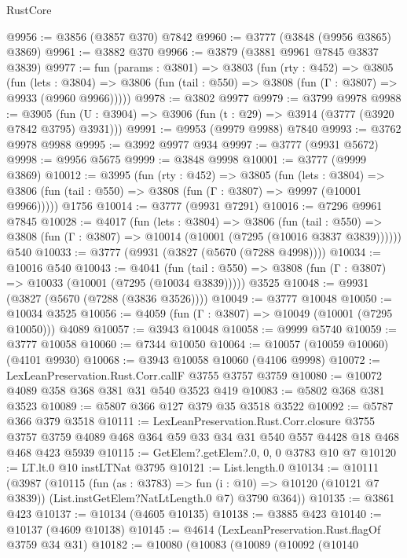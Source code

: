 \begin{lexlean}{RustCore}
\begin{coremodule}
@9956 := @3856 (@3857 @370) @7842
@9960 := @3777 (@3848 (@9956 @3865) @3869)
@9961 := @3882 @370
@9966 := @3879 (@3881 @9961 @7845 @3837 @3839)
@9977 := fun (params : @3801) =>
  @3803
    (fun (rty : @452) =>
    @3805
      (fun (lets : @3804) =>
      @3806 (fun (tail : @550) => @3808 (fun (Γ : @3807) => @9933 (@9960 @9966)))))
@9978 := @3802 @9977
@9979 := @3799 @9978
@9988 := @3905 (fun (U : @3904) => @3906 (fun (t : @29) => @3914 (@3777 (@3920 @7842 @3795) @3931)))
@9991 := @9953 (@9979 @9988) @7840
@9993 := @3762 @9978 @9988
@9995 := @3992 @9977 @934
@9997 := @3777 (@9931 @5672)
@9998 := @9956 @5675
@9999 := @3848 @9998
@10001 := @3777 (@9999 @3869)
@10012 := @3995
    (fun (rty : @452) =>
    @3805
      (fun (lets : @3804) =>
      @3806 (fun (tail : @550) => @3808 (fun (Γ : @3807) => @9997 (@10001 @9966)))))
    @1756
@10014 := @3777 (@9931 @7291)
@10016 := @7296 @9961 @7845
@10028 := @4017
    (fun (lets : @3804) =>
    @3806
      (fun (tail : @550) =>
      @3808 (fun (Γ : @3807) => @10014 (@10001 (@7295 (@10016 @3837 @3839))))))
    @540
@10033 := @3777 (@9931 (@3827 (@5670 (@7288 @4998))))
@10034 := @10016 @540
@10043 := @4041
    (fun (tail : @550) => @3808 (fun (Γ : @3807) => @10033 (@10001 (@7295 (@10034 @3839)))))
    @3525
@10048 := @9931 (@3827 (@5670 (@7288 (@3836 @3526))))
@10049 := @3777 @10048
@10050 := @10034 @3525
@10056 := @4059 (fun (Γ : @3807) => @10049 (@10001 (@7295 @10050))) @4089
@10057 := @3943 @10048
@10058 := @9999 @5740
@10059 := @3777 @10058
@10060 := @7344 @10050
@10064 := @10057 (@10059 @10060) (@4101 @9930)
@10068 := @3943 @10058 @10060 (@4106 @9998)
@10072 := LexLeanPreservation.Rust.Corr.callF @3755 @3757 @3759
@10080 := @10072 @4089 @358 @368 @381 @31 @540 @3523 @419
@10083 := @5802 @368 @381 @3523
@10089 := @5807 @366 @127 @379 @35 @3518 @3522
@10092 := @5787 @366 @379 @3518
@10111 := LexLeanPreservation.Rust.Corr.closure
    @3755
    @3757
    @3759
    @4089
    @468
    @364
    @59
    @33
    @34
    @31
    @540
    @557
    @4428
    @18
    @468
    @468
    @423
    @5939
@10115 := GetElem?.getElem?.{0, 0, 0} @3783 @10 @7
@10120 := LT.lt.{0} @10 instLTNat @3795
@10121 := List.length.{0}
@10134 := @10111
    (@3987
      (@10115
        (fun (as : @3783) => fun (i : @10) => @10120 (@10121 @7 @3839))
        (List.instGetElem?NatLtLength.{0} @7)
        @3790
        @364))
@10135 := @3861 @423
@10137 := @10134 (@4605 @10135)
@10138 := @3885 @423
@10140 := @10137 (@4609 @10138)
@10145 := @4614 (LexLeanPreservation.Rust.flagOf @3759 @34 @31)
@10182 := @10080
    (@10083
      (@10089
        (@10092
          (@10140

\end{coremodule}
\end{lexlean}
